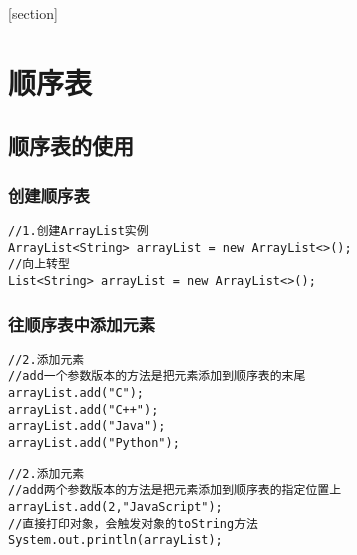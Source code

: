 \documentclass[a4paper]{report}
\begin{document}
\flushbottom%
\newcommand{\dm}[1]{\colorbox{wgray}{\lstinline`#1`}}
\newcommand{\myroman}[1]{\uppercase\expandafter{\romannumeral#1}}
[section] \renewcommand{\thenum}{\arabic{num}.} \newcommand{\num}{\refstepcounter{num}\text{\thenum}}

\newenvironment{tips}{\kaishu\zihao{-6}\color{blue}{\noindent\rule[-3pt]{\textwidth}{0.5pt}\par \em \noindent {\zihao{-5} \textcolor[rgb]{1.00,0.00,0.00}{Tips}}}\par}{\\ \rule[3mm]{\textwidth}{0.5pt}\par}

\newenvironment{zhengming}{\kaishu\zihao{-5}\color{blue}{\noindent\em 证明：}\par}{\hfill $\diamondsuit$\par}

\tableofcontents
{}%
\clearpage
{}%
\chapter{顺序表}
\section{顺序表的使用}
\subsection{创建顺序表}
\begin{lstlisting}
//1.创建ArrayList实例
ArrayList<String> arrayList = new ArrayList<>();
//向上转型
List<String> arrayList = new ArrayList<>();
\end{lstlisting}
\subsection{往顺序表中添加元素}
\begin{lstlisting}[title=add一个参数]
//2.添加元素
//add一个参数版本的方法是把元素添加到顺序表的末尾
arrayList.add("C");
arrayList.add("C++");
arrayList.add("Java");
arrayList.add("Python");
\end{lstlisting}

\begin{lstlisting}[title=add两个参数]
//2.添加元素
//add两个参数版本的方法是把元素添加到顺序表的指定位置上
arrayList.add(2,"JavaScript");
//直接打印对象，会触发对象的toString方法
System.out.println(arrayList);
\end{lstlisting}
\end{document}
